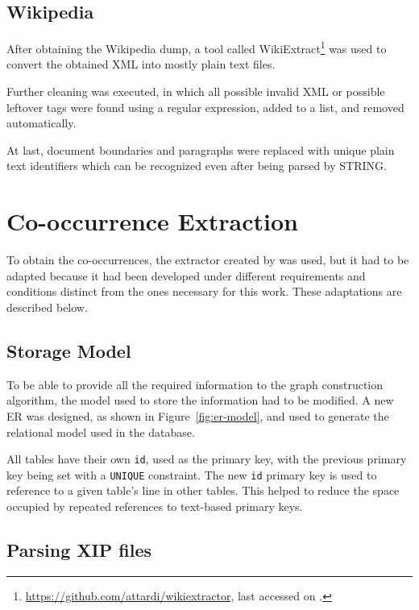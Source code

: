 \subsection{Wikipedia}

After obtaining the Wikipedia dump, a tool called 
WikiExtract\footnote{\url{https://github.com/attardi/wikiextractor}, last 
accessed on .} was used to convert the obtained \ac{XML} 
into mostly plain text files.

Further cleaning was executed, in which all possible invalid \ac{XML} or
possible leftover tags were found using a regular expression, added to a list,
and removed automatically.

At last, document boundaries and paragraphs were replaced with unique
plain text identifiers which can be recognized even after being parsed by
\ac{STRING}.

\section{Co-occurrence Extraction}

To obtain the co-occurrences, the extractor created by \citet{correia2015syntax}
was used, but it had to be adapted because it had been developed under different
requirements and conditions distinct from the ones necessary for this work. 
These adaptations are described below.

\subsection{Storage Model}

To be able to provide all the required information to the graph construction
algorithm, the model used to store the information had to be modified. A new 
\ac{ER} was designed, as shown in Figure~\ref{fig:er-model}, and used to
generate the relational model used in the database.

All tables have their own \texttt{id}, used as the primary key, with the 
previous primary key being set with a \texttt{UNIQUE} constraint. The new 
\texttt{id} primary key is used to reference to a given table's line in other 
tables. This helped to reduce the space occupied by repeated references to 
text-based primary keys.

\subsection{Parsing \ac{XIP} files}

